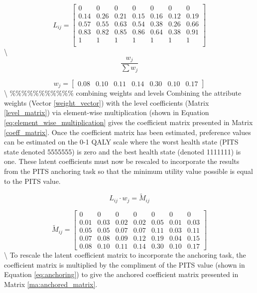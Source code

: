 \documentclass[
  letterpaper,
  DIV=11,
  numbers=noendperiod]{scrartcl}
\begin{document}
\begin{equation}\label{level_matrix}
L_{ij} = 
\begin{bmatrix}
0 & 0 & 0 & 0 & 0 & 0 & 0 \\
0.14 & 0.26 & 0.21 & 0.15 & 0.16 & 0.12 & 0.19 \\
0.57 & 0.55 & 0.63 & 0.54 & 0.38 & 0.26 & 0.66 \\
0.83 & 0.82 & 0.85 & 0.86 & 0.64 & 0.38 & 0.91 \\
1 & 1 & 1 & 1 & 1 & 1 & 1 \\
\end{bmatrix}
\end{equation} \textbackslash{}
\begin{equation}\label{eq:weight_normalise}
    \frac{w_{j}}{\sum{w_j}}
\end{equation}

\begin{equation}\label{weight_vector}
w_j = \begin{bmatrix}
    0.08& 0.10& 0.11& 0.14& 0.30& 0.10& 0.17
\end{bmatrix} 
\end{equation} \textbackslash{} \%\%\%\%\%\%\%\%\%\%\% combining weights
and levels Combining the attribute weights (Vector \ref{weight_vector})
with the level coefficients (Matrix \ref{level_matrix}) via element-wise
multiplication (shown in Equation \ref{eq:element_wise_multiplication}
gives the coefficient matrix presented in Matrix \ref{coeff_matrix}.
Once the coefficient matrix has been estimated, preference values can be
estimated on the 0-1 QALY scale where the worst health state (PITS state
denoted 5555555) is zero and the best health state (denoted 1111111) is
one. These latent coefficients must now be rescaled to incorporate the
results from the PITS anchoring task so that the minimum utility value
possible is equal to the PITS value.

\begin{equation}\label{eq:element_wise_multiplication}
    L_{ij} \cdot  w_{j} = {\tilde{M}}_{ij}
\end{equation}

\begin{equation}\label{coeff_matrix}
\tilde{M}_{ij} =  
\begin{bmatrix}
0 & 0 & 0 & 0 & 0 & 0 & 0 \\
0.01 & 0.03 & 0.02 & 0.02 & 0.05 & 0.01 & 0.03 \\
0.05 & 0.05 & 0.07 & 0.07 & 0.11 & 0.03 & 0.11 \\
0.07 & 0.08 & 0.09 & 0.12 & 0.19 & 0.04 & 0.15 \\
0.08 & 0.10 & 0.11 & 0.14 & 0.30 & 0.10 & 0.17
\end{bmatrix}
\end{equation} \textbackslash{} To rescale the latent coefficient matrix
to incorporate the anchoring task, the coefficient matrix is multiplied
by the compliment of the PITS value (shown in Equation
\ref{eq:anchoring}) to give the anchored coefficient matrix presented in
Matrix \ref{ma:anchored_matrix}.
\end{document}
